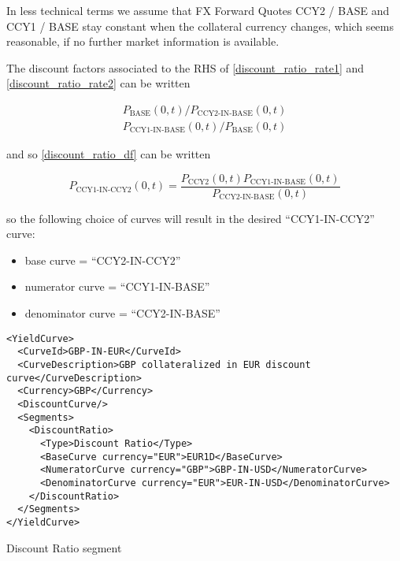 In less technical terms we assume that FX Forward Quotes CCY2 / BASE and CCY1 / BASE stay constant when the collateral
currency changes, which seems reasonable, if no further market information is available.

The discount factors associated to the RHS of \ref{discount_ratio_rate1} and \ref{discount_ratio_rate2} can be written

\begin{eqnarray}
  P_{\text{BASE}}(0,t) / P_{\text{CCY2-IN-BASE}}(0,t) \\
  P_{\text{CCY1-IN-BASE}}(0,t) / P_{\text{BASE}}(0,t)
\end{eqnarray}

and so \ref{discount_ratio_df} can be written

\begin{equation}\label{discount_ratio_df2}
  P_{\text{CCY1-IN-CCY2}}(0,t) = \frac{P_{\text{CCY2}}(0,t) P_{\text{CCY1-IN-BASE}}(0,t)}{P_{\text{CCY2-IN-BASE}}(0,t)}
\end{equation}

so the following choice of curves will result in the desired ``CCY1-IN-CCY2'' curve:

\begin{itemize}
\item base curve = ``CCY2-IN-CCY2''
\item numerator curve = ``CCY1-IN-BASE''
\item denominator curve = ``CCY2-IN-BASE''
\end{itemize}

\begin{listing}[H]
\begin{verbatim}
<YieldCurve>
  <CurveId>GBP-IN-EUR</CurveId>
  <CurveDescription>GBP collateralized in EUR discount curve</CurveDescription>
  <Currency>GBP</Currency>
  <DiscountCurve/>
  <Segments>
    <DiscountRatio>
      <Type>Discount Ratio</Type>
      <BaseCurve currency="EUR">EUR1D</BaseCurve>
      <NumeratorCurve currency="GBP">GBP-IN-USD</NumeratorCurve>
      <DenominatorCurve currency="EUR">EUR-IN-USD</DenominatorCurve>
    </DiscountRatio>
  </Segments>
</YieldCurve>
\end{verbatim}
\caption{Discount Ratio segment}
\label{lst:discount_ratio_segment}
\end{listing}

